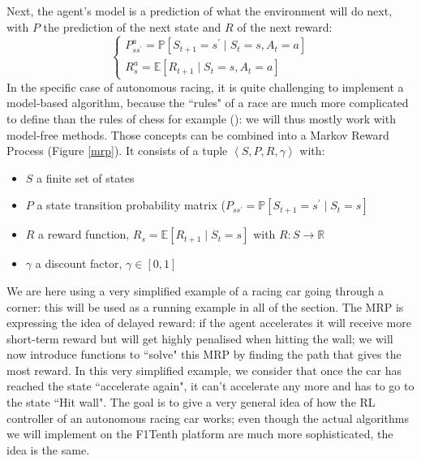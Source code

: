 Next, the agent's model is a prediction of what the environment will do next, with $P$ the prediction of the next state and $R$ of the next reward:
 \begin{equation}
 	\begin{cases}
 		P_{s s^{'}}^{a}=\mathbb{P}[S_{t+1}=s^{'} \mid S_t = s, A_t = a ] \\
 		R_{s}^{a} = \mathbb{E} [ R_{t+1} \mid S_{t} = s, A_t = a ]
 	\end{cases}
 \end{equation}
 In the specific case of autonomous racing, it is quite challenging to implement a model-based algorithm, because the ``rules" of a race are much more complicated to define than the rules of chess for example (\cite{modelbased}): we will thus mostly work with model-free methods. \newline
 Those concepts can be combined into a Markov Reward Process (Figure \ref{mrp}). It consists of a tuple $\left< S,P,R,\gamma \right>$ with:
 \begin{itemize}
 	\item $S$ a finite set of states
 	\item $P$ a state transition probability matrix ($P_{s s^{'}} = \mathbb{P} \left[ S_{t+1} = s^{'} \mid S_t = s \right]$
 	\item $R$ a reward function, $R_s = \mathbb{E} \left[ R_{t+1} \mid S_t = s \right]$ with $R: S \rightarrow \mathbb{R}$
 	\item $\gamma$ a discount factor, $\gamma \in [0,1]$
 \end{itemize}
 
 We are here using a very simplified example of a racing car going through a corner: this will be used as a running example in all of the section.
 The MRP is expressing the idea of delayed reward: if the agent accelerates it will receive more short-term reward but will get highly penalised when hitting the wall; we will now introduce functions to ``solve" this MRP by finding the path that gives the most reward. In this very simplified example, we consider that once the car has reached the state ``accelerate again", it can't accelerate any more and has to go to the state ``Hit wall". \newline
 The goal is to give a very general idea of how the RL controller of an autonomous racing car works; even though the actual algorithms we will implement on the F1Tenth platform are much more sophisticated, the idea is the same.
 
